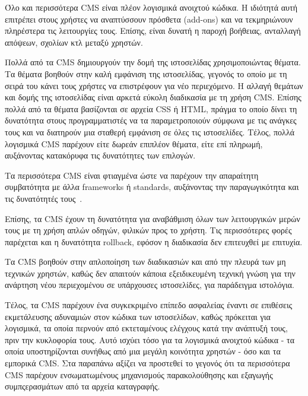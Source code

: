 \documentclass[12pt]{report}
\begin{document}
Όλο και περισσότερα \textlatin{CMS} είναι πλέον λογισμικά ανοιχτού κώδικα. Η ιδιότητά αυτή επιτρέπει στους χρήστες να αναπτύσσουν πρόσθετα (\textlatin{add-ons}) και να τεκμηριώνουν πληρέστερα τις λειτουργίες τους. Επίσης, είναι δυνατή η παροχή βοήθειας, ανταλλαγή απόψεων, σχολίων κτλ μεταξύ χρηστών.

Πολλά από τα \textlatin{CMS} δημιουργούν την δομή της ιστοσελίδας χρησιμοποιώντας θέματα. Τα θέματα βοηθούν στην καλή εμφάνιση της ιστοσελίδας, γεγονός το οποίο με τη σειρά του κάνει τους χρήστες να επιστρέφουν για νέο περιεχόμενο. Η αλλαγή θεμάτων και δομής της ιστοσελίδας είναι αρκετά εύκολη διαδικασία με τη χρήση \textlatin{CMS}. Επίσης πολλά από τα θέματα βασίζονται σε αρχεία \textlatin{CSS} ή \textlatin{HTML}, πράγμα το οποίο δίνει τη δυνατότητα στους προγραμματιστές να τα παραμετροποιούν σύμφωνα με τις ανάγκες τους και να διατηρούν μια σταθερή εμφάνιση σε όλες τις ιστοσελίδες. Τέλος, πολλά λογισμικά \textlatin{CMS} παρέχουν είτε δωρεάν επιπλέον θέματα, είτε επί πληρωμή, αυξάνοντας κατακόρυφα τις δυνατότητες των επιλογών.

Τα περισσότερα \textlatin{CMS} είναι φτιαγμένα ώστε να παρέχουν την απαραίτητη συμβατότητα με άλλα \textlatin{frameworks} ή \textlatin{standards}, αυξάνοντας την παραγωγικότητα και τις δυνατότητές τους~\cite{wikipedia_2017:02}.

Επίσης, τα \textlatin{CMS} έχουν τη δυνατότητα για αναβάθμιση όλων των λειτουργικών μερών τους με τη χρήση απλών οδηγών, φιλικών προς το χρήστη. Τις περισσότερες φορές παρέχεται και η δυνατότητα \textlatin{rollback}, εφόσον η διαδικασία δεν επιτευχθεί με επιτυχία.

Τα \textlatin{CMS} βοηθούν στην απλοποίηση των διαδικασιών και από την πλευρά των μη τεχνικών χρηστών, καθώς δεν απαιτούν κάποια εξειδικευμένη τεχνική γνώση για την ανάρτηση νέου περιεχομένου σε υπάρχουσες ιστοσελίδες, για παράδειγμα ιστολόγια.

Τέλος, τα \textlatin{CMS} παρέχουν ένα συγκεκριμένο επίπεδο ασφαλείας έναντι σε επιθέσεις εκμετάλευσης αδυναμιών στον κώδικα των ιστοσελίδων, καθώς πρόκειται για λογισμικά, τα οποία περνούν από εκτεταμένους ελέγχους κατά την ανάπτυξή τους, πριν την κυκλοφορία τους. Αυτό ισχύει τόσο για τα λογισμικά ανοιχτού κώδικα - τα οποία υποστηρίζονται συνήθως από μια μεγάλη κοινότητα χρηστών - όσο και τα εμπορικά \textlatin{CMS}. Στα παραπάνω αξίζει να προστεθεί το γεγονός ότι τα περισσότερα \textlatin{CMS} παρέχουν ενσωματωμένους μηχανισμούς παρακολούθησης και εξαγωγής συμπςερασμάτων από τα αρχεία καταγραφής.
\end{document}
